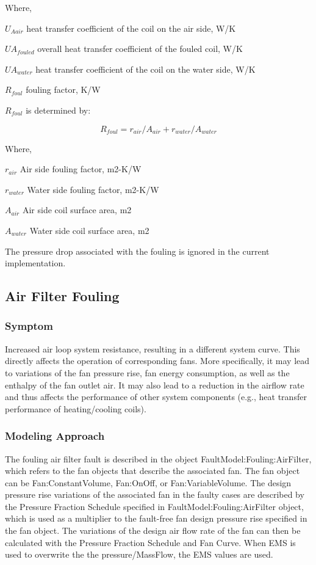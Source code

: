 Where,

\(U_{Aair}\) heat transfer coefficient of the coil on the air side, W/K

\(UA_{fouled}\) overall heat transfer coefficient of the fouled coil, W/K

\(UA_{water}\) heat transfer coefficient of the coil on the water side, W/K

\(R_{foul}\) fouling factor, K/W

\(R_{foul}\) is determined by:

\begin{equation}
R_{foul} = r_{air}/A_{air} + r_{water} / A_{water}
\end{equation}

Where,

\(r_{air}\) Air side fouling factor, m2-K/W

\(r_{water}\) Water side fouling factor, m2-K/W

\(A_{air}\) Air side coil surface area, m2

\(A_{water}\) Water side coil surface area, m2

The pressure drop associated with the fouling is ignored in the current implementation.

\subsection{Air Filter Fouling}\label{air-filter-fouling}

\subsubsection{Symptom}\label{symptom-3}

Increased air loop system resistance, resulting in a different system curve. This directly affects the operation of corresponding fans. More specifically, it may lead to variations of the fan pressure rise, fan energy consumption, as well as the enthalpy of the fan outlet air. It may also lead to a reduction in the airflow rate and thus affects the performance of other system components (e.g., heat transfer performance of heating/cooling coils).

\subsubsection{Modeling Approach}\label{modeling-approach-3}

The fouling air filter fault is described in the object FaultModel:Fouling:AirFilter, which refers to the fan objects that describe the associated fan. The fan object can be Fan:ConstantVolume, Fan:OnOff, or Fan:VariableVolume. The design pressure rise variations of the associated fan in the faulty cases are described by the Pressure Fraction Schedule specified in FaultModel:Fouling:AirFilter object, which is used as a multiplier to the fault-free fan design pressure rise specified in the fan object. The variations of the design air flow rate of the fan can then be calculated with the Pressure Fraction Schedule and Fan Curve. When EMS is used to overwrite the the pressure/MassFlow, the EMS values are used.

